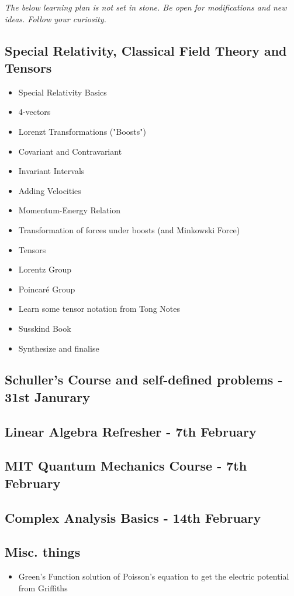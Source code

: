 \textit{The below learning plan is not set in stone. Be open for modifications and new ideas. Follow your curiosity.}
\subsection*{Special Relativity, Classical Field Theory and Tensors}
\begin{itemize}
    \item Special Relativity Basics
    \item 4-vectors
    \item Lorenzt Transformations ("Boosts")
    \item Covariant and Contravariant
    \item Invariant Intervals
    \item Adding Velocities
    \item Momentum-Energy Relation
    \item Transformation of forces under boosts (and Minkowski Force)
    \item Tensors
    \item Lorentz Group
    \item Poincaré Group 
    \item Learn some tensor notation from Tong Notes
    \item Susskind Book 
    \item Synthesize and finalise
\end{itemize}
\subsection*{Schuller's Course and self-defined problems - 31st Janurary}
\subsection*{Linear Algebra Refresher - 7th February}
\subsection*{MIT Quantum Mechanics Course - 7th February}
\subsection*{Complex Analysis Basics - 14th February}
\subsection*{Misc. things}
\begin{itemize}
    \item Green's Function solution of Poisson's equation to get the electric potential from Griffiths
\end{itemize}